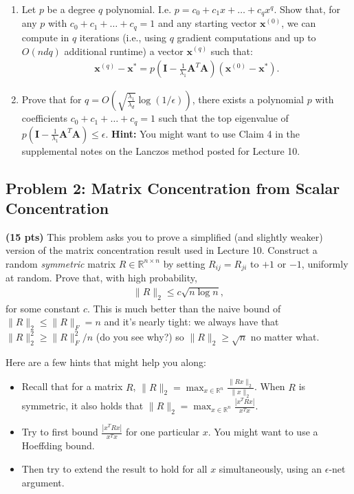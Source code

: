 \documentclass[10pt]{article}
\newcommand{\bv}[1]{\mathbf{#1}}
\newcommand{\R}{\mathbb{R}}
\begin{document}
\begin{enumerate}
	\item Let $p$ be a degree $q$ polynomial. I.e. $p = c_0 + c_1 x + \ldots + c_q x^q$. Show that, for any $p$ with $c_0 + c_1 + \ldots + c_q = 1$ and any starting vector $\bv{x}^{(0)}$, we can compute in $q$ iterations (i.e., using $q$ gradient computations and up to $O(ndq)$ additional runtime) a vector $\bv{x}^{(q)}$ such that:
	\begin{align*}
			\bv{x}^{(q)} - \bv{x}^* = p\left(\bv{I} - \frac{1}{\lambda_1}\bv{A}^T\bv{A}\right)(\bv{x}^{(0)} - \bv{x}^*).
		\end{align*}
	\item Prove that for $q = O(\sqrt{\frac{\lambda_1}{\lambda_d}} \log(1/\epsilon))$, there exists a polynomial $p$ with coefficients $c_0 + c_1 + \ldots + c_q = 1$ such that the top eigenvalue of $p\left(\bv{I} - \frac{1}{\lambda_1}\bv{A}^T\bv{A}\right) \leq \epsilon$. \textbf{Hint:} You might want to use Claim 4 in the supplemental notes on the Lanczos method posted for Lecture 10.
\end{enumerate}

\subsection{Problem 2: Matrix Concentration from Scalar Concentration}
\textbf{(15 pts)}   This problem asks you to prove a simplified (and slightly weaker) version of the matrix concentration result used in Lecture 10. 
Construct a random \emph{symmetric} matrix $R \in \R^{n\times n}$ by setting $R_{ij} = R_{ji}$ to $+1$ or $-1$, uniformly at random. Prove that, with high probability,
\begin{align*}
	\|R\|_2 \leq c\sqrt{n\log n},
\end{align*}
for some constant $c$. This is much better than the naive bound of $\|R\|_2 \leq \|R\|_F = n$ and it's nearly tight: we always have that $\|R\|_2^2 \geq \|R\|_F^2/n$ (do you see why?) so $\|R\|_2 \geq \sqrt{n}$ no matter what. 

Here are a few hints that might help you along:
\begin{itemize}
	\item Recall that for a matrix $R$,  $\|R\|_2 = \max_{x \in \R^n} \frac{\|R x\|_2}{\|x\|_2}$. When $R$ is symmetric, it also holds that $\|R\|_2 = \max_{x \in \R^n} \frac{|x^T R x|}{x^Tx}$.
	\item Try to first bound $\frac{|x^T R x|}{x^Tx}$ for one particular $x$. You might want to use a {Hoeffding bound}.
	\item Then try to extend the result to hold for all $x$ simultaneously, using an $\epsilon$-net argument.
\end{itemize}
\end{document}
